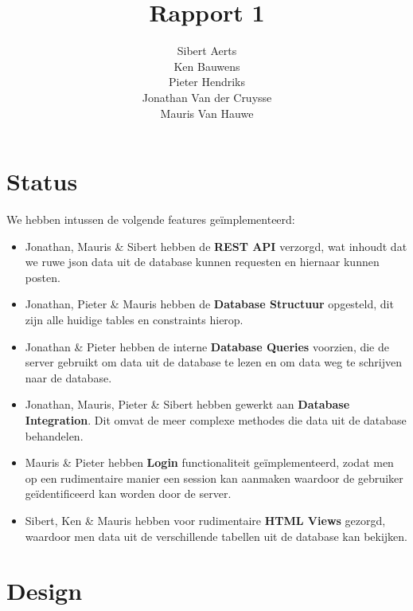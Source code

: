 \documentclass[12pt,a4paper]{article}
\begin{document}
\title{Rapport 1}
\author{Sibert Aerts \\ Ken Bauwens \\ Pieter Hendriks \\ Jonathan Van der Cruysse \\ Mauris Van Hauwe}
\maketitle

\newcommand{\code}[1]{\texttt{#1}}

\section{Status}

We hebben intussen de volgende features ge\"implementeerd:

\begin{itemize}

\item Jonathan, Mauris \& Sibert hebben de \textbf{REST API} verzorgd, wat inhoudt dat we ruwe json data uit de database kunnen requesten en hiernaar kunnen posten.

\item Jonathan, Pieter \& Mauris hebben de \textbf{Database Structuur} opgesteld, dit zijn alle huidige tables en constraints hierop.

\item Jonathan \& Pieter hebben de interne \textbf{Database Queries} voorzien, die de server gebruikt om data uit de database te lezen en om data weg te schrijven naar de database.

\item Jonathan, Mauris, Pieter \& Sibert hebben gewerkt aan \textbf{Database Integration}. Dit omvat de meer complexe methodes die data uit de database behandelen.

\item Mauris \& Pieter hebben \textbf{Login} functionaliteit ge\"implementeerd, zodat men op een rudimentaire manier een session kan aanmaken waardoor de gebruiker ge\"identificeerd kan worden door de server. 

\item Sibert, Ken \& Mauris hebben voor rudimentaire \textbf{HTML Views} gezorgd, waardoor men data uit de verschillende tabellen uit de database kan bekijken.

\end{itemize}

\section{Design}
\end{document}
